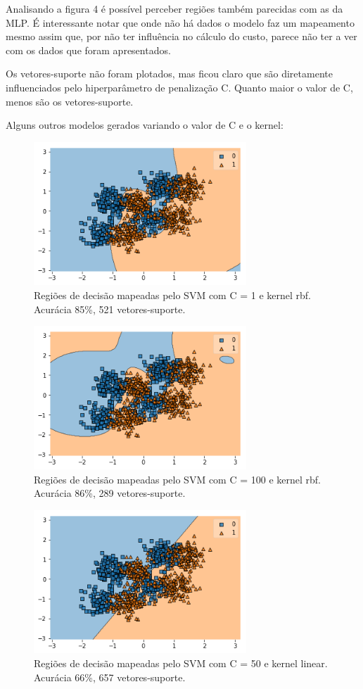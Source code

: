 \documentclass[a4paper, 12pt]{article}
\begin{document}
Analisando a figura 4 é possível perceber regiões também parecidas com as da MLP. É interessante notar que onde não há dados o modelo faz um mapeamento mesmo assim que, por não ter influência no cálculo do custo, parece não ter a ver com os dados que foram apresentados.


Os vetores-suporte não foram plotados, mas ficou claro que são diretamente influenciados pelo hiperparâmetro de penalização C. Quanto maior o valor de C, menos são os vetores-suporte.

Alguns outros modelos gerados variando o valor de C e o kernel:

\begin{figure}[H]
    \centering
  \includegraphics[width=8cm]{images/regions_svm_1_rbf.png}
    \caption{Regiões de decisão mapeadas pelo SVM com C = 1 e kernel rbf. Acurácia 85\%, 521 vetores-suporte.}
\end{figure}

\begin{figure}[H]
    \centering
  \includegraphics[width=8cm]{images/regions_svm_100_rbf.png}
    \caption{Regiões de decisão mapeadas pelo SVM com C = 100 e kernel rbf. Acurácia 86\%, 289 vetores-suporte.}
\end{figure}

\begin{figure}[H]
    \centering
  \includegraphics[width=8cm]{images/regions_svm_50_linear.png}
    \caption{Regiões de decisão mapeadas pelo SVM com C = 50 e kernel linear. Acurácia 66\%, 657 vetores-suporte.}
\end{figure}
\end{document}
